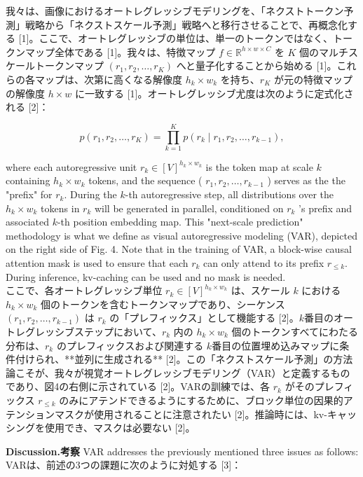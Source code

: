 \documentclass{article}
\begin{document}
我々は、画像におけるオートレグレッシブモデリングを、「ネクストトークン予測」戦略から「ネクストスケール予測」戦略へと移行させることで、再概念化する [1]。ここで、オートレグレッシブの単位は、単一のトークンではなく、トークンマップ全体である [1]。我々は、特徴マップ $f \in \mathbb{R}^{h \times w \times C}$ を $K$ 個のマルチスケールトークンマップ $(r_1, r_2, \ldots, r_K)$ へと量子化することから始める [1]。これらの各マップは、次第に高くなる解像度 $h_k \times w_k$ を持ち、$r_K$ が元の特徴マップの解像度 $h \times w$ に一致する [1]。オートレグレッシブ尤度は次のように定式化される [2]：


$$
p\left(r_{1}, r_{2}, \ldots, r_{K}\right)=\prod_{k=1}^{K} p\left(r_{k} \mid r_{1}, r_{2}, \ldots, r_{k-1}\right),
$$

where each autoregressive unit $r_{k} \in[V]^{h_{k} \times w_{k}}$ is the token map at scale $k$ containing $h_{k} \times w_{k}$ tokens, and the sequence ( $r_{1}, r_{2}, \ldots, r_{k-1}$ ) serves as the the "prefix" for $r_{k}$. During the $k$-th autoregressive step, all distributions over the $h_{k} \times w_{k}$ tokens in $r_{k}$ will be generated in parallel, conditioned on $r_{k}$ 's prefix and associated $k$-th position embedding map. This "next-scale prediction" methodology is what we define as visual autoregressive modeling (VAR), depicted on the right side of Fig. 4. Note that in the training of VAR, a block-wise causal attention mask is used to ensure that each $r_{k}$ can only attend to its prefix $r_{\leq k}$. During inference, kv-caching can be used and no mask is needed.\\

ここで、各オートレグレッシブ単位 $r_k \in [V]^{h_k \times w_k}$ は、スケール $k$ における $h_k \times w_k$ 個のトークンを含むトークンマップであり、シーケンス $(r_1, r_2, \ldots, r_{k-1})$ は $r_k$ の「プレフィックス」として機能する [2]。$k$番目のオートレグレッシブステップにおいて、$r_k$ 内の $h_k \times w_k$ 個のトークンすべてにわたる分布は、$r_k$ のプレフィックスおよび関連する $k$番目の位置埋め込みマップに条件付けられ、**並列に生成される** [2]。この「ネクストスケール予測」の方法論こそが、我々が視覚オートレグレッシブモデリング（VAR）と定義するものであり、図4の右側に示されている [2]。VARの訓練では、各 $r_k$ がそのプレフィックス $r_{\le k}$ のみにアテンドできるようにするために、ブロック単位の因果的アテンションマスクが使用されることに注意されたい [2]。推論時には、kv-キャッシングを使用でき、マスクは必要ない [2]。

\textbf{Discussion.考察} VAR addresses the previously mentioned three issues as follows:
VARは、前述の3つの課題に次のように対処する [3]：
\end{document}
